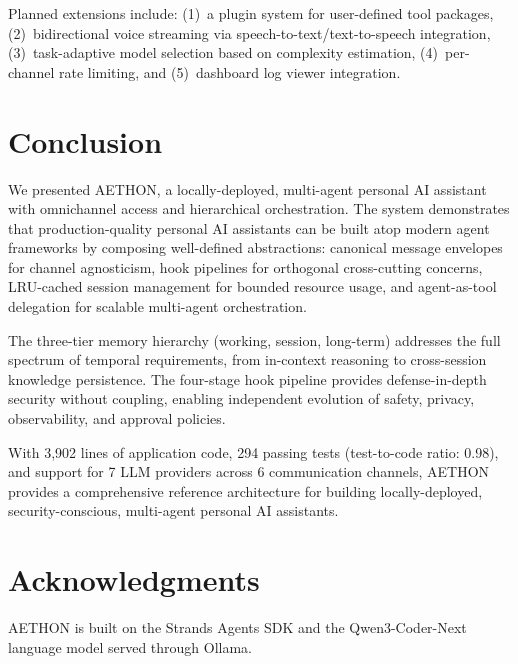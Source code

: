 \documentclass[9pt,twocolumn,letterpaper]{extarticle}
\begin{document}
Planned extensions include: (1)~a plugin system for user-defined tool packages, (2)~bidirectional voice streaming via speech-to-text/text-to-speech integration, (3)~task-adaptive model selection based on complexity estimation, (4)~per-channel rate limiting, and (5)~dashboard log viewer integration.

\section{Conclusion}
\label{sec:conclusion}

We presented AETHON, a locally-deployed, multi-agent personal AI assistant with omnichannel access and hierarchical orchestration.
The system demonstrates that production-quality personal AI assistants can be built atop modern agent frameworks by composing well-defined abstractions: canonical message envelopes for channel agnosticism, hook pipelines for orthogonal cross-cutting concerns, LRU-cached session management for bounded resource usage, and agent-as-tool delegation for scalable multi-agent orchestration.

The three-tier memory hierarchy (working, session, long-term) addresses the full spectrum of temporal requirements, from in-context reasoning to cross-session knowledge persistence.
The four-stage hook pipeline provides defense-in-depth security without coupling, enabling independent evolution of safety, privacy, observability, and approval policies.

With 3{,}902 lines of application code, 294 passing tests (test-to-code ratio: 0.98), and support for 7 LLM providers across 6 communication channels, AETHON provides a comprehensive reference architecture for building locally-deployed, security-conscious, multi-agent personal AI assistants.

\section*{Acknowledgments}

AETHON is built on the Strands Agents SDK and the Qwen3-Coder-Next language model served through Ollama.
\end{document}
